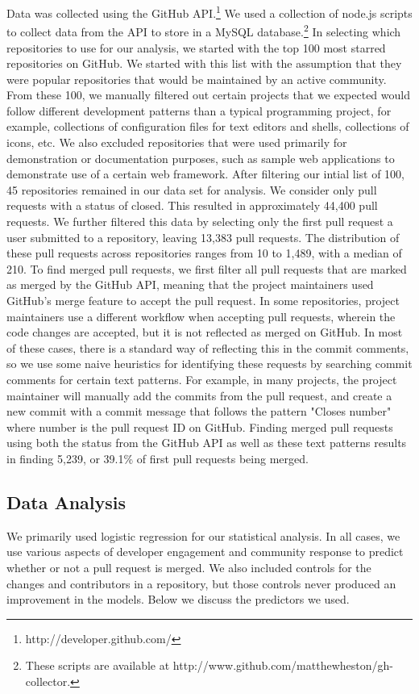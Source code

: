 \documentclass{sigchi}
\begin{document}
Data was collected using the GitHub API.\footnote{http://developer.github.com/}
We used a collection of node.js scripts to collect data from the API to store in
a MySQL database.\footnote{These scripts are available at
http://www.github.com/matthewheston/gh-collector.} In selecting which
repositories to use for our analysis, we started with the top 100 most starred
repositories on GitHub. We started with this list with the assumption that they
were popular repositories that would be maintained by an active community. From
these 100, we manually filtered out certain projects that we expected would
follow different development patterns than a typical programming project, for
example, collections of configuration files for text editors and shells,
collections of icons, etc. We also excluded repositories that were used
primarily for demonstration or documentation purposes, such as sample web
applications to demonstrate use of a certain web framework. After filtering our
intial list of 100, 45 repositories remained in our data set for analysis. We
consider only pull requests with a status of closed. This resulted in
approximately 44,400 pull requests. We further filtered this data by selecting
only the first pull request a user submitted to a repository, leaving 13,383
pull requests. The distribution of these pull requests across repositories
ranges from 10 to 1,489, with a median of 210. To find merged pull requests, we
first filter all pull requests that are marked as merged by the GitHub API,
meaning that the project maintainers used GitHub's merge feature to accept the
pull request. In some repositories, project maintainers use a different workflow
when accepting pull requests, wherein the code changes are accepted, but it is
not reflected as merged on GitHub. In most of these cases, there is a standard
way of reflecting this in the commit comments, so we use some naive heuristics
for identifying these requests by searching commit comments for certain text
patterns. For example, in many projects, the project maintainer will manually
add the commits from the pull request, and create a new commit with a commit
message that follows the pattern "Closes {number}" where {number} is the pull
request ID on GitHub. Finding merged pull requests using both the status from
the GitHub API as well as these text patterns results in finding 5,239, or
39.1\% of first pull requests being merged.

\subsection{Data Analysis} \label{sec:data_analysis} We primarily used logistic
regression for our statistical analysis. In all cases, we use various aspects of
developer engagement and community response to predict whether or not a pull
request is merged. We also included controls for the changes and contributors in
a repository, but those controls never produced an improvement in the models.
Below we discuss the predictors we used.
\end{document}
